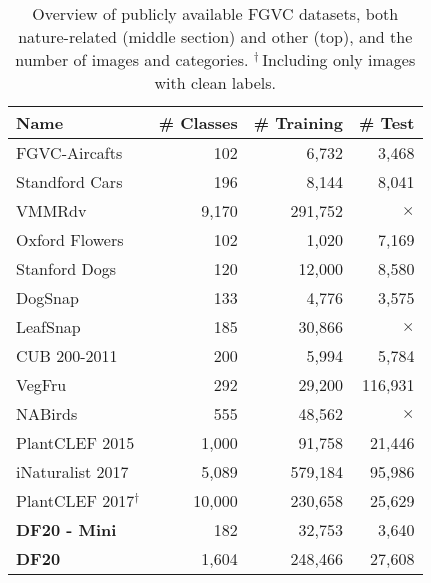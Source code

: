 \documentclass[10pt,twocolumn,letterpaper]{article}
\begin{document}
\begin{table}[!t]
\begin{center}
\renewcommand{\arraystretch}{1.1}
\setlength{\tabcolsep}{0.4em}
\begin{tabular}{|l|r|r|r|}
\hline
Name & \# Classes & \# Training & \# Test \\
\hline
FGVC-Aircafts\,\cite{aircafts}              &  102   &  6,732  &  3,468   \\
Standford Cars\,\cite{dataset-Cars}          &  196   &  8,144  &  8,041   \\
VMMRdv\,\cite{vmmrdb}                        &  9,170    &  291,752  &  $\times$   \\
\hline
Oxford Flowers\,\cite{dataset-flower}              &    102 &   1,020 &   7,169  \\
Stanford Dogs\,\cite{dogsnap_dataset}              &    120 &  12,000 &   8,580  \\
DogSnap\,\cite{dogsnap_dataset}                    &    133 &   4,776 &   3,575  \\
LeafSnap\,\cite{leafsnap}                          &    185 &  30,866 & $\times$ \\
CUB 200-2011\,\cite{dataset-CUBS}                  &    200 &   5,994 &    5,784 \\
VegFru\,\cite{vegfru_dataset}                      &    292 &  29,200 & 116,931  \\
NABirds\,\cite{nabirds_dataset}                    &    555 &  48,562 & $\times$ \\
PlantCLEF 2015\,\cite{plantclef2015}               &  1,000 &  91,758 &  21,446  \\
iNaturalist 2017\,\cite{inaturalist2017}           &  5,089 & 579,184 &  95,986  \\
PlantCLEF 2017{$^{\dagger}$}\,\cite{plantclef2017} & 10,000 & 230,658 &  25,629  \\
\hline \hline
\textbf{DF20 - Mini}        &    182 &  32,753 &   3,640  \\
\textbf{DF20}               &  1,604 & 248,466 &  27,608  \\
\hline
\end{tabular}
\end{center}
\caption{Overview of publicly available FGVC datasets, both nature-related (middle section) and other (top), and the number of images and categories. {$^{\dagger}$}\,Including only images with clean labels.}
\label{table:fgvc_datasets}
\end{table}
\end{document}
